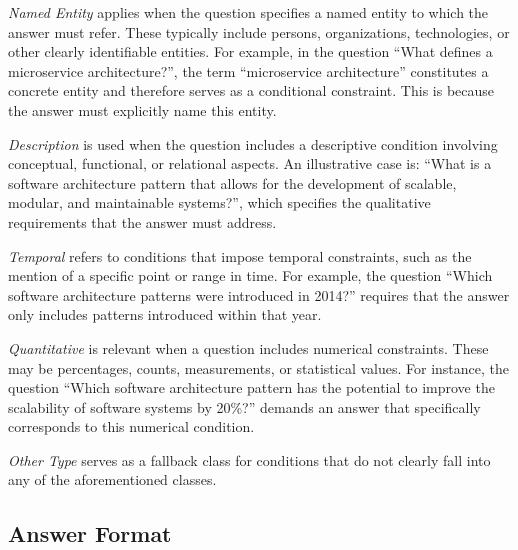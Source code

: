 \emph{Named Entity} applies when the question specifies a named entity to which the answer must refer. These typically include persons, organizations, technologies, or other clearly identifiable entities. For example, in the question \enquote{What defines a microservice architecture?}, the term \enquote{microservice architecture} constitutes a concrete entity and therefore serves as a conditional constraint. This is because the answer must explicitly name this entity.

\emph{Description} is used when the question includes a descriptive condition involving conceptual, functional, or relational aspects. An illustrative case is: \enquote{What is a software architecture pattern that allows for the development of scalable, modular, and maintainable systems?}, which specifies the qualitative requirements that the answer must address.

\emph{Temporal} refers to conditions that impose temporal constraints, such as the mention of a specific point or range in time. For example, the question \enquote{Which software architecture patterns were introduced in 2014?} requires that the answer only includes patterns introduced within that year.

\emph{Quantitative} is relevant when a question includes numerical constraints. These may be percentages, counts, measurements, or statistical values. For instance, the question \enquote{Which software architecture pattern has the potential to improve the scalability of software systems by 20\%?} demands an answer that specifically corresponds to this numerical condition.

\emph{Other Type} serves as a fallback class for conditions that do not clearly fall into any of the aforementioned classes.


\subsection{Answer Format}

